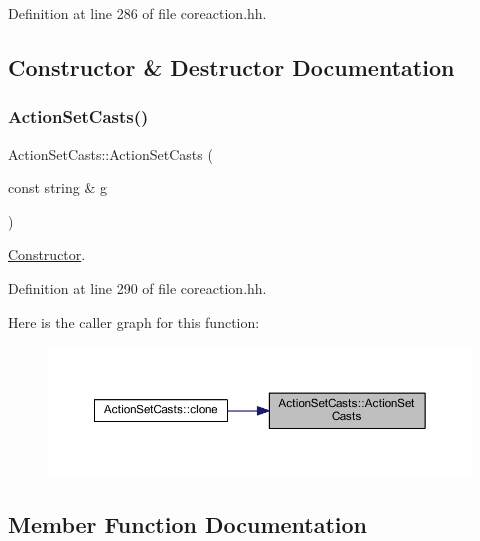Definition at line 286 of file coreaction.\+hh.



\subsection{Constructor \& Destructor Documentation}
\mbox{\label{class_action_set_casts_abf39e01428d035f90fbcbafd5c06fd7c}} 
\subsubsection{\texorpdfstring{ActionSetCasts()}{ActionSetCasts()}}
{\footnotesize\ttfamily Action\+Set\+Casts\+::\+Action\+Set\+Casts (\begin{DoxyParamCaption}\item[{const string \&}]{g }\end{DoxyParamCaption})\hspace{0.3cm}{\ttfamily [inline]}}



\mbox{\hyperlink{class_constructor}{Constructor}}. 



Definition at line 290 of file coreaction.\+hh.

Here is the caller graph for this function\+:
\nopagebreak
\begin{figure}[H]
\begin{center}
\leavevmode
\includegraphics[width=350pt]{class_action_set_casts_abf39e01428d035f90fbcbafd5c06fd7c_icgraph}
\end{center}
\end{figure}


\subsection{Member Function Documentation}
\mbox{\label{class_action_set_casts_a9999706f3347f707e39c28b5a208fbd3}} 
